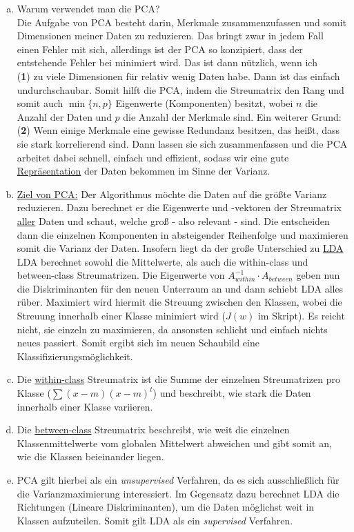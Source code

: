 \begin{aufgabe}
\end{aufgabe}

\begin{enumerate}[a)]
	\item Warum verwendet man die PCA?\\
	Die Aufgabe von PCA besteht darin, Merkmale zusammenzufassen und somit Dimensionen meiner Daten zu reduzieren. Das bringt zwar in jedem Fall einen Fehler mit sich, allerdings ist der PCA so konzipiert, dass der entstehende Fehler bei minimiert wird. Das ist dann nützlich, wenn ich \\
	(\textbf{1}) zu viele Dimensionen für relativ wenig Daten habe. Dann ist das einfach undurchschaubar. Somit hilft die PCA, indem die Streumatrix den Rang und somit auch $\min\{n,p\}$ Eigenwerte (Komponenten) besitzt, wobei $n$ die Anzahl der Daten und $p$ die Anzahl der Merkmale sind. Ein weiterer Grund: \\
	(\textbf{2}) Wenn einige Merkmale eine gewisse Redundanz besitzen, das heißt, dass sie stark korrelierend sind. Dann lassen sie sich zusammenfassen und die PCA arbeitet dabei schnell, einfach und effizient, sodass wir eine gute \underline{Repräsentation} der Daten bekommen im Sinne der Varianz.
	\item \underline{Ziel von PCA:} Der Algorithmus möchte die Daten auf die größte Varianz reduzieren. Dazu berechnet er die Eigenwerte und -vektoren der Streumatrix \underline{aller} Daten und schaut, welche groß - also relevant - sind. Die entscheiden dann die einzelnen Komponenten in absteigender Reihenfolge und maximieren somit die Varianz der Daten. Insofern liegt da der große Unterschied zu \underline{LDA}\\
	LDA berechnet sowohl die Mittelwerte, als auch die within-class und between-class Streumatrizen. Die Eigenwerte von $A_{within}^{-1}\cdot A_{between}$ geben nun die Diskriminanten für den neuen Unterraum an und dann schiebt LDA alles rüber. Maximiert wird hiermit die Streuung zwischen den Klassen, wobei die Streuung innerhalb einer Klasse minimiert wird ($J(w)$ im Skript). Es reicht nicht, sie einzeln zu maximieren, da ansonsten schlicht und einfach nichts neues passiert. Somit ergibt sich im neuen Schaubild eine Klassifizierungsmöglichkeit. 
 	\item Die \underline{within-class} Streumatrix ist die Summe der einzelnen Streumatrizen pro Klasse ($\sum (x-m)(x-m)^t$) und beschreibt, wie stark die Daten innerhalb einer Klasse variieren.
 	\item Die \underline{between-class} Streumatrix beschreibt, wie weit die einzelnen Klassenmittelwerte vom globalen Mittelwert abweichen und gibt somit an, wie die Klassen beieinander liegen.
	\item PCA gilt hierbei als ein \textit{unsupervised} Verfahren, da es sich ausschließlich für die Varianzmaximierung interessiert. Im Gegensatz dazu berechnet LDA die Richtungen (Lineare Diskriminanten), um die Daten möglichst weit in Klassen aufzuteilen. Somit gilt LDA als ein \textit{supervised} Verfahren.
\end{enumerate}

